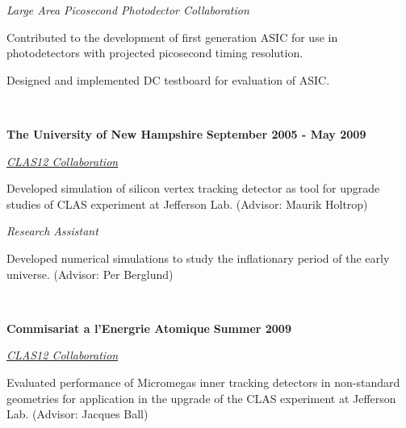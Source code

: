 \documentclass[10pt]{article}
\newenvironment{outerlist}[1][\enskip\textbullet]%
        {\begin{itemize}[#1]}{\end{itemize}%
         \vspace{-.6\baselineskip}}
\newenvironment{innerlist}[1][\enskip\textbullet]%
        {\begin{compactitem}[#1]}{\end{compactitem}}
\begin{document}
\begin{outerlist}
\item[] \textit{Large Area Picosecond Photodector Collaboration}%
         \begin{innerlist}
            \item Contributed to the development of first generation ASIC for use in photodetectors with projected picosecond timing resolution.
            \item Designed and implemented DC testboard for evaluation of ASIC.
        \end{innerlist}~
\end{outerlist}

\vspace*{3mm}

\textbf{The University of New Hampshire}    \hfill \textbf{September 2005 - May 2009}
\begin{outerlist}
\item[] \textit{\href{https://www.jlab.org/Hall-B/clas12-web/}{CLAS12 Collaboration}}%
    \begin{innerlist}
        \item Developed simulation of silicon vertex tracking detector as tool for upgrade studies of CLAS experiment at Jefferson Lab.  (Advisor: Maurik Holtrop)
    \end{innerlist}
\item[] \textit{Research Assistant}%
    \begin{innerlist}
        \item Developed numerical simulations to study the inflationary period of the early universe.  (Advisor: Per Berglund)
    \end{innerlist}~
\end{outerlist}

\vspace*{-1mm}

\textbf{Commisariat a l'Energrie Atomique}    \hfill \textbf{Summer 2009}
\begin{outerlist}
\item[] \textit{\href{https://www.jlab.org/Hall-B/clas12-web/}{CLAS12 Collaboration}}%
    \begin{innerlist}
        \item Evaluated performance of Micromegas inner tracking detectors in non-standard geometries for application in the upgrade of the CLAS experiment at Jefferson Lab.  (Advisor: Jacques Ball)
    \end{innerlist}~
\end{outerlist}
\end{document}
